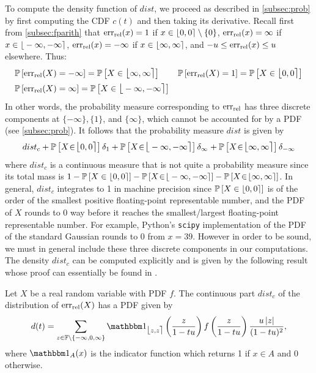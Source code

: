 To compute the density function of $dist$, we proceed as described in \cref{subsec:prob} by first computing the CDF $c(t)$ and then taking its derivative.  Recall first from \cref{subsec:fparith} that $\mathrm{err}_{\mathrm{rel}}(x)=1$ if $x\in \fintvl[0]\setminus\{0\}$,  $\mathrm{err}_{\mathrm{rel}}(x)=\infty$ if $x\in \fintvl[-\infty]$,  $\mathrm{err}_{\mathrm{rel}}(x)=-\infty$ if $x\in \fintvl[\infty]$, and $-u \leq \mathrm{err}_{\mathrm{rel}}(x)\leq u$ elsewhere.  Thus:
\begin{align*}
& \Pro{\erel(X)=-\infty}=\Pro{X\in\fintvl[\infty]} 
& \Pro{\erel(X)=1}=\Pro{X\in\fintvl[0]} \\
& \Pro{\erel(X)=\infty}=\Pro{X\in\fintvl[-\infty]}
\end{align*}
In other words, the probability measure corresponding to $\mathrm{err}_{\mathrm{rel}}$ has three discrete components at $\{-\infty\}, \{1\}$,  and $\{\infty\}$, which cannot be accounted for by a PDF (see \cref{subsec:prob}).  It follows that the probability measure $dist$ is given by
\begin{align}
dist_c + \Pro{X\ssvin\fintvl[0]}\delta_1 + \Pro{X\ssvin\fintvl[-\infty]}\delta_{\infty}\ \hspace{-3pt}+ \Pro{X\ssvin\fintvl[\infty]}\delta_{-\infty}\label{eq:densitydecomp}
\end{align}
where $dist_c$ is a continuous measure that is not quite a probability measure since its total mass is $1-\Pro{X\in\fintvl[0]}-\Pro{X\ssvin\fintvl[-\infty]} - \Pro{X\ssvin\fintvl[\infty]}$. 
In general, $dist_c$ integrates to 1 in machine precision since $\Pro{X\in\fintvl[0]}$ is of the order of the smallest positive floating-point representable number, and the PDF of $X$ rounds to 0 way before it reaches the smallest/largest floating-point representable number. For example, Python's \texttt{scipy} implementation of the PDF of the standard Gaussian rounds to 0 from $x=39$.  However in order to be sound, we must in general include these three discrete components in our computations. The density $dist_c$ can be computed explicitly and is given by the following result whose proof can essentially be found in \cite{dahlqvist2019probabilistic}.

\begin{theorem}\label{thm:LP_errorDensity}
Let $X$ be a real random variable with PDF $f$. The continuous part $dist_c$ of the distribution of $\mathrm{err}_{\mathrm{rel}}(X)$ has a PDF given by
\begin{align}
d(t)=\sum_{z\in\F\setminus\{-\infty,0,\infty\}}\one_{\fintvl[z]}\left(\frac{z}{1-t\uro}\right) f\left(\frac{z}{1-t\uro}\right) \frac{\uro\absv{z}}{(1-t\uro)^2},\label{eq:LPerrorDensity}
\end{align}
where $\one_{A}(x)$ is the indicator function which returns 1 if $x\in A$ and 0 otherwise. 
\end{theorem}

